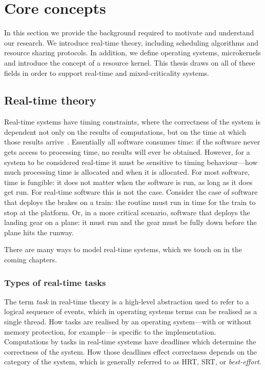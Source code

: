 




\chapter{Core concepts}
\label{chap:background}

In this section we provide the background required to motivate and understand our research.
We introduce real-time theory, including scheduling algorithms and resource sharing protocols.
In addition, we define operating systems, microkernels and introduce the concept of a resource kernel.
This thesis draws on all of these fields in order to support real-time and mixed-criticality systems.

\section{Real-time theory}
\label{sec:real-time-theory}

Real-time systems have timing constraints, where the correctness of the system is dependent not only
on the results of computations, but on the time at which those results arrive~\citep{Stankovic_88}.
Essentially all software consumes time: if the software never gets access to processing time, no
results will ever be obtained.  However, for a system to be considered real-time it must be
sensitive to timing behaviour---how much processing time is allocated and when it is allocated. For
most software, time is fungible: it does not matter when the software is run, as long as it does get
run. For real-time software this is not the case.  Consider the case of software that deploys the
brakes on a train: the routine must run in time for the train to stop at the platform. Or, in a more
critical scenario, software that deploys the landing gear on a plane: it must run and the gear must
be fully down before the plane hits the runway.

There are many ways to model real-time systems, which we touch on in the coming chapters. 

\subsection{Types of real-time tasks}

The term \emph{task} in real-time theory is a high-level abstraction used to refer to a logical
sequence of events, which in 
operating systems terms can be realised as a single thread. How tasks
are realised by an operating system---with or without memory protection, for example---is specific to the
implementation.  Computations by tasks in real-time systems have deadlines which determine the
correctness of the system. How those deadlines effect correctness depends on the category of the
system, which is generally referred to as \gls{HRT}, \gls{SRT}, or \emph{best-effort}.

